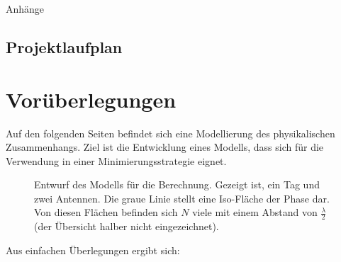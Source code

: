 %
%
%
%

\begin{appendix}
\newpage
\huge{Anhänge}
\normalsize

\begin{landscape}
\section{Projektlaufplan}
\label{sec:projectplan}
  \begin{center}
	\scalebox{.75}{
		
	}
	\end{center}
\newpage
\end{landscape}


\newpage
\section{Vorüberlegungen}
\label{sec:calculations}
Auf den folgenden Seiten befindet sich eine Modellierung des physikalischen Zusammenhangs. Ziel ist die Entwicklung eines Modells, dass sich für die Verwendung in einer Minimierungsstrategie eignet.

\begin{figure}[h]
	\begin{center}
		
		 \caption[Kurzeintrag]{Entwurf des Modells für die Berechnung. Gezeigt ist, ein Tag und zwei Antennen. Die graue Linie stellt eine Iso-Fläche der Phase dar. Von diesen Flächen befinden sich $N$ viele mit einem Abstand von $\frac{\lambda}{2}$ (der Übersicht halber nicht eingezeichnet).} 
	\end{center}
\end{figure}

Aus einfachen Überlegungen ergibt sich:


\end{appendix}

